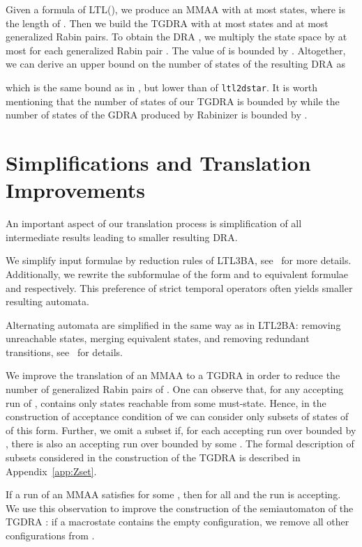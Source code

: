 \documentclass{llncs}
\begin{document}
Given a formula  of LTL(), we produce an MMAA with
at most  states, where  is the length of .  Then we build the
TGDRA  with at most  states and at most  generalized
Rabin pairs.  To obtain the DRA , we multiply the state space by at
most  for each generalized Rabin pair .  The value of 
is bounded by . Altogether, we can derive an upper bound on the number of
states of the resulting DRA as

which is the same bound as in \cite{KE12}, but lower than  of \texttt{ltl2dstar}.  It is worth mentioning that the number of
states of our TGDRA is bounded by  while the number of
states of the GDRA produced by Rabinizer is bounded by
. 



\section{Simplifications and Translation Improvements}
\label{sec:simplifications}

An important aspect of our translation process is simplification of all
intermediate results leading to smaller resulting DRA.

We simplify input formulae by reduction rules of LTL3BA,
see~\cite{BKRS12} for more details. Additionally, we rewrite the
subformulae of the form  and  to equivalent
formulae  and  respectively. This preference of
strict temporal operators often yields smaller resulting automata.

Alternating automata are simplified in the same way as in LTL2BA: removing
unreachable states, merging equivalent states, and removing redundant
transitions, see~\cite{GO01} for details.

We improve the translation of an MMAA  to a TGDRA  in order to
reduce the number of generalized Rabin pairs of .  One can observe
that, for any accepting run  of ,  contains
only states reachable from some must-state.  Hence, in the construction of
acceptance condition of  we can consider only subsets  of states
of  of this form.  Further, we omit a subset  if, for each
accepting run over  bounded by , there is also an accepting run
over  bounded by some .  The formal description of
subsets  considered in the construction of the TGDRA  is described
in Appendix~\ref{app:Zset}.

If a run  of an MMAA satisfies  for
some , then  for all  and the run is accepting.
We use this observation to improve the construction of the semiautomaton
 of the TGDRA : if a macrostate  contains the empty
configuration, we remove all other configurations from .
\end{document}
